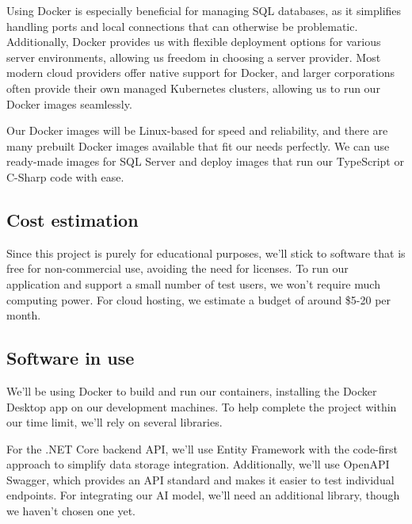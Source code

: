 \documentclass[conference]{IEEEtran}
\begin{document}
            Using Docker is especially beneficial for managing SQL databases, as it simplifies handling ports and local connections that can otherwise be problematic. Additionally, Docker provides us with flexible deployment options for various server environments, allowing 
            us freedom in choosing a server provider. Most modern cloud 
            providers offer native support for Docker, and larger corporations often provide their own managed Kubernetes clusters, allowing 
            us to run our Docker images seamlessly.\newline
        
            Our Docker images will be Linux-based for speed and reliability, and there are many prebuilt Docker images available that fit our needs perfectly. We can use ready-made images for SQL Server and deploy images that run our TypeScript or C-Sharp code with ease.
            \newline

        \subsection {Cost estimation}
        
            Since this project is purely for educational purposes, we’ll stick to software that is free for non-commercial use, avoiding the need for licenses. To run our application and support a small number of test users, we won’t require much computing power. For cloud hosting, we estimate a budget of around \$5-20 per month.
            \newline

        \subsection {Software in use}

            We'll be using Docker to build and run our containers, installing the Docker Desktop app on our development machines. To help complete the project within our time limit, we’ll rely on several libraries.
            \newline

            For the .NET Core backend API, we’ll use Entity Framework with the code-first approach to simplify data storage integration. Additionally, we’ll use OpenAPI Swagger, which provides an API standard and makes it easier to test individual endpoints. For integrating our AI model, we’ll need an additional library, though we haven’t chosen one yet.
            \newline
            
\end{document}
